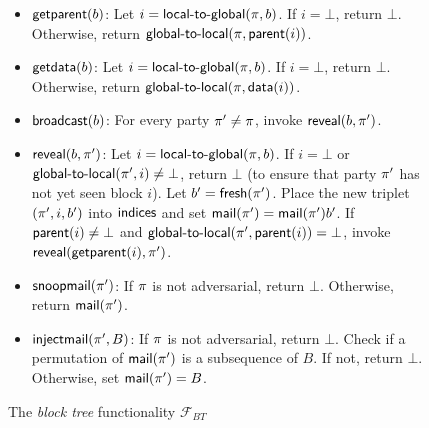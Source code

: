 \begin{figure*}
{\begin{minipage}{0.9 \textwidth}
\begin{itemize}
            If $X = 0$, then the return $\bot$, indicating that
            mining has been unsuccessful. Otherwise, increment
            $\blocks$ indicating that mining has been successful and
            place $(\party, \blocks, b')$ into
            $\indices$, where $b' = \fresh(\party)$.
            Set $\parent(\blocks) = i$ and $\data(\blocks) = \vec{x}$.
            Finally, return $b'$.
      \item $\textsf{getparent}(b)$:
            Let $i = \textsf{local-to-global}(\pi, b)$. If $i = \bot$, return $\bot$.
            Otherwise, return $\textsf{global-to-local}(\pi, \textsf{parent}(i))$.
      \item $\textsf{getdata}(b)$:
            Let $i = \textsf{local-to-global}(\pi, b)$. If $i = \bot$, return $\bot$.
            Otherwise, return $\textsf{global-to-local}(\pi, \textsf{data}(i))$.
      \item $\textsf{broadcast}(b)$:
            For every party $\pi' \neq \pi$, invoke
            $\textsf{reveal}(b, \pi')$.
      \item $\textsf{reveal}(b, \pi')$:
            Let $i = \textsf{local-to-global}(\pi, b)$. If
            $i = \bot$ or $\textsf{global-to-local}(\pi', i) \neq \bot$,
            return $\bot$ (to ensure that party $\pi'$ has
            not yet seen block $i$). Let
            $b' = \textsf{fresh}(\pi')$.
            Place the new triplet $(\pi', i, b')$ into $\indices$ and
            set $\textsf{mail}(\pi') = \textsf{mail}(\pi') b'$.
            If $\textsf{parent}(i) \neq \bot$ and $\textsf{global-to-local}(\pi', \textsf{parent}(i)) = \bot$,
            invoke $\textsf{reveal}(\textsf{getparent}(i), \pi')$.
      \item $\textsf{snoopmail}(\pi')$:
            If $\pi$ is not adversarial, return $\bot$. Otherwise, return
            $\textsf{mail}(\pi')$.
      \item $\textsf{injectmail}(\pi', B)$:
            If $\pi$ is not adversarial, return $\bot$.
            Check if a permutation of $\textsf{mail}(\pi')$ is a subsequence of $B$.
            If not, return $\bot$. Otherwise, set $\textsf{mail}(\pi') = B$.
  \end{itemize}

	\end{minipage}
}
\caption{
The \emph{block tree} functionality $\mathcal{F}_{BT}$
\label{fig:blocktree}
}
\end{figure*}
